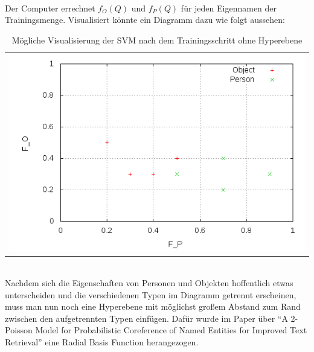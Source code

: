 \\
Der Computer errechnet $f_O\left( Q \right)\text{ und } f_P\left( Q \right)$ für jeden Eigennamen der Trainingsmenge. Visualisiert könnte ein Diagramm dazu wie folgt aussehen:
\begin{table}[h]
	\centering
	\begin{tabular}{c}
		\includegraphics[scale=0.5]{pics/svm_training}
	\end{tabular}
	\caption{Mögliche Visualisierung der SVM nach dem Trainingsschritt ohne Hyperebene}
	\label{tab:svm_training}
\end{table}\\
Nachdem sich die Eigenschaften von Personen und Objekten hoffentlich etwas unterscheiden und die verschiedenen Typen im Diagramm getrennt erscheinen, muss man nun noch eine Hyperebene mit möglichst großem Abstand zum Rand zwischen den aufgetrennten Typen einfügen. Dafür wurde im Paper über ``A 2-Poisson Model for Probabilistic Coreference of Named Entities for Improved Text Retrieval'' \cite{paper:Na} eine Radial Basis Function herangezogen. 

